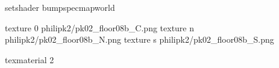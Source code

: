 setshader bumpspecmapworld

texture 0 philipk2/pk02_floor08b_C.png
texture n philipk2/pk02_floor08b_N.png
texture s philipk2/pk02_floor08b_S.png

texmaterial 2
